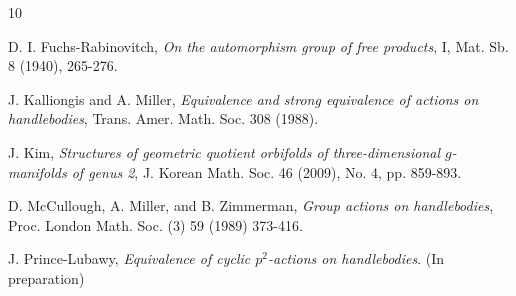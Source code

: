 \documentclass{amsart}
\theoremstyle{definition}
\numberwithin{equation}{section}
\begin{document}

\begin{thebibliography}{10}

\smallskip

D. I. Fuchs-Rabinovitch,
\emph{On the automorphism group of free products},
I, Mat. Sb. 8 (1940), 265-276.

\smallskip

J. Kalliongis and A. Miller,
\emph{Equivalence and strong equivalence of actions on handlebodies},
Trans. Amer. Math. Soc. 308 (1988).

\smallskip

J. Kim,
\emph{Structures of geometric quotient orbifolds of three-dimensional $g$-manifolds of genus 2},
J. Korean Math. Soc. 46 (2009), No. 4, pp. 859-893.

\smallskip


D. McCullough, A. Miller, and B. Zimmerman,
\emph{Group actions on handlebodies}, Proc. London Math. Soc. (3) 59 (1989) 373-416.



\smallskip


J. Prince-Lubawy,
\emph{Equivalence of cyclic $p^2$-actions on handlebodies}. (In preparation)

\smallskip

\end{thebibliography}
\end{document}
